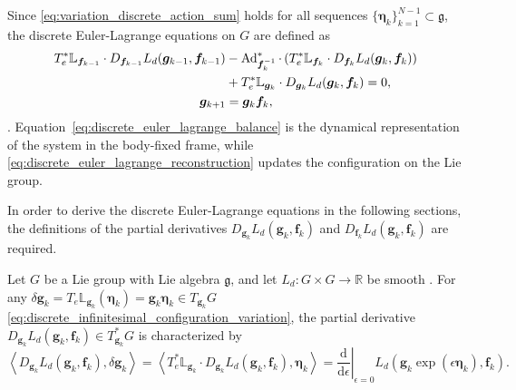 Since \eqref{eq:variation_discrete_action_sum} holds for all 
sequences $\{\bm{\eta}_k\}_{k=1}^{N-1}\subset\mathfrak g$, the discrete Euler-Lagrange 
equations on $G$ are defined as
\begin{subequations}
\label{eq:discrete_euler_lagrange_lie_group}
\begin{align}
    T_e^*\mathbb{L}_{\bm{f}_{k-1}} \cdot D_{\bm{f}_{k-1}}L_d(\bm{g}_{k-1},\bm{f}_{k-1})
    &-
    \operatorname{Ad}_{\bm{f}_k^{-1}}^* \cdot
    \left(T_e^*\mathbb{L}_{\bm{f}_k} \cdot D_{\bm{f}_k}L_d(\bm{g}_k,\bm{f}_k)\right)
    \notag\\
    &+
    T_e^*\mathbb{L}_{\bm{g}_k} \cdot D_{\bm{g}_k}L_d(\bm{g}_k,\bm{f}_k)
    =0,
    \label{eq:discrete_euler_lagrange_balance}\\
    \bm{g}_{k+1}&=\bm{g}_k\bm{f}_k,
    \label{eq:discrete_euler_lagrange_reconstruction}
\end{align}
\end{subequations}
\cite{Lee2008}.
Equation~\eqref{eq:discrete_euler_lagrange_balance} is the dynamical representation of the
system in the body-fixed frame, while 
\eqref{eq:discrete_euler_lagrange_reconstruction} updates 
the configuration on the Lie group. 

In order to derive the discrete Euler-Lagrange equations in the following sections, 
the definitions of the partial derivatives $D_{\bm{g}_k}L_d(\bm{g}_k,\bm{f}_k)$ and $D_{\bm{f}_k}L_d(\bm{g}_k,\bm{f}_k)$ are required. 

\begin{proposition}
\label{prop:directional_derivative_discrete_g}
Let $G$ be a Lie group with Lie algebra $\mathfrak g$, and let $L_d:G\times G\rightarrow\mathbb R$ be smooth \cite{Hall2000LieGroups}. 
For any $\delta\bm{g}_k=T_e\mathbb{L}_{\bm{g}_k}(\bm{\eta}_k)=\bm{g}_k\bm{\eta}_k \in T_{\bm{g}_k}G$ \eqref{eq:discrete_infinitesimal_configuration_variation}, the partial derivative $D_{\bm{g}_k}L_d(\bm{g}_k,\bm{f}_k)\in T_{\bm{g}_k}^*G$ is characterized by
\begin{equation}
    \left\langle D_{\bm{g}_k}L_d(\bm{g}_k,\bm{f}_k),\delta\bm{g}_k\right\rangle
    =
    \left\langle T_e^*\mathbb{L}_{\bm{g}_k} \cdot D_{\bm{g}_k}L_d(\bm{g}_k,\bm{f}_k),\bm{\eta}_k\right\rangle
    =
    \left.\frac{\mathrm d}{\mathrm d\epsilon}\right|_{\epsilon=0}
    L_d\!\left(\bm{g}_k\exp(\epsilon\bm{\eta}_k),\bm{f}_k\right).
    \label{eq:directional_derivative_discrete_g}
\end{equation}
\end{proposition}

